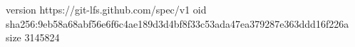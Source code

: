version https://git-lfs.github.com/spec/v1
oid sha256:9eb58a68abf56e6f6c4ae189d3d4bf8f33c53ada47ea379287e363ddd16f226a
size 3145824
